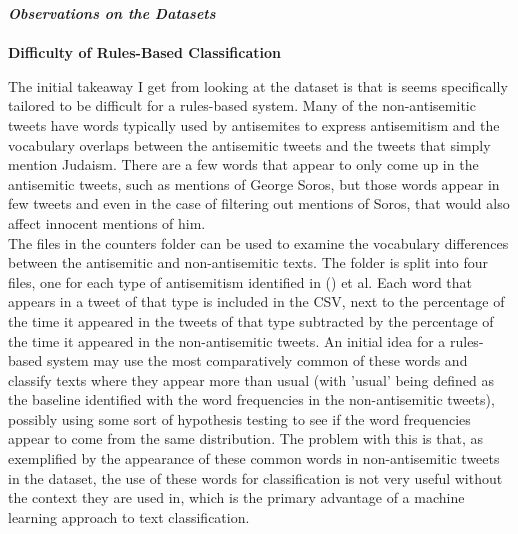 \documentclass{article}
\begin{document}
{\bf \emph{Observations on the Datasets}}\\\\

{\bf Difficulty of Rules-Based Classification}

The initial takeaway I get from looking at the dataset is that is seems specifically tailored to be difficult for a rules-based system. Many of the non-antisemitic tweets have words typically used by antisemites to express antisemitism and the vocabulary overlaps between the antisemitic tweets and the tweets that simply mention Judaism. There are a few words that appear to only come up in the antisemitic tweets, such as mentions of George Soros, but those words appear in few tweets and even in the case of filtering out mentions of Soros, that would also affect innocent mentions of him. \\

The files in the counters folder can be used to examine the vocabulary differences between the antisemitic and non-antisemitic texts. The folder is split into four files, one for each type of antisemitism identified in () et al. Each word that appears in a tweet of that type is included in the CSV, next to the percentage of the time it appeared in the tweets of that type subtracted by the percentage of the time it appeared in the non-antisemitic tweets. An initial idea for a rules-based system may use the most comparatively common of these words and classify texts where they appear more than usual (with 'usual' being defined as the baseline identified with the word frequencies in the non-antisemitic tweets), possibly using some sort of hypothesis testing to see if the word frequencies appear to come from the same distribution. The problem with this is that, as exemplified by the appearance of these common words in non-antisemitic tweets in the dataset, the use of these words for classification is not very useful without the context they are used in, which is the primary advantage of a machine learning approach to text classification.
\end{document}

